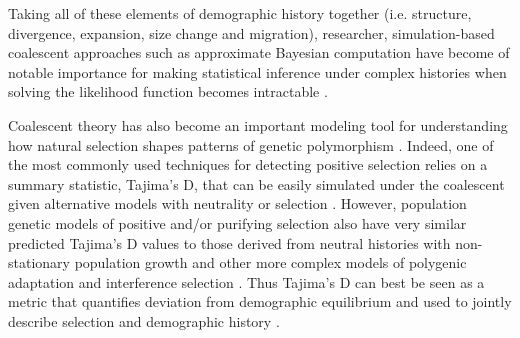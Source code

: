 \documentclass[12pt]{article}
\begin{document}
Taking all of these elements of demographic history together
% 
% 
% 
(i.e. structure, divergence, expansion, size change and migration),
researcher, simulation-based coalescent approaches such as approximate
Bayesian computation \citep{Beaumont2010-to, Pritchard1999-zf} have
become of notable importance for making statistical inference under
complex histories when solving the likelihood function becomes
intractable \citep{Sunnaker2013-ts}.

Coalescent theory has also become an important modeling tool for
understanding how natural selection shapes patterns of genetic
polymorphism \citep{Kim2002-ex, Kern2016-ap, Ewing2016-bm}. Indeed,
% 
% 
% 
one of the most commonly used techniques for detecting positive
selection relies on a summary statistic, Tajima's D, that can be
easily simulated under the coalescent given alternative models with
neutrality or selection \citep{Tajima1989-mc}. However, population
genetic models of positive and/or purifying selection also have very
similar predicted Tajima's D values to those derived from neutral
histories with non-stationary population growth
\citep{Freedman2016-yx, Barton1998-xs, Barton2000-gr, Jensen2005-ef,
  Schrider2016-cw} and other more complex models of polygenic adaptation and interference selection
\citep{Stephan2016-lf, Good2014-fq}. Thus Tajima's D can best be seen
as a metric that quantifies deviation from demographic equilibrium and
used to jointly describe selection and demographic history
\citep{Kern2016-ap, Ewing2016-bm, Phung2016-uo, Roux2016-hz}.
\end{document}
